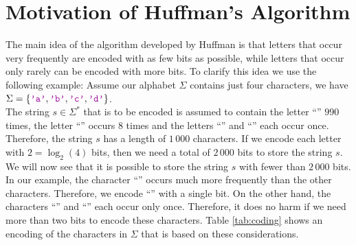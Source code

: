 \section[Motivation]{Motivation of  Huffman's Algorithm \label{sec:huffman}}
The main idea of the
algorithm developed by Huffman is that letters that occur very frequently are encoded with
as few bits as possible, while letters that occur only rarely can be encoded with more bits. 
To clarify this idea we use the following example:  Assume our alphabet $\Sigma$ contains just four characters, we have
\\[0.2cm]
\hspace*{1.3cm}
$\Sigma = \{ \mytt{'a'}, \mytt{'b'}, \mytt{'c'}, \mytt{'d'} \}$. 
\\[0.2cm]
The string $s \in \Sigma^*$ that is to be encoded is assumed to contain the letter
``'' $990$ times, the letter ``'' occurs $8$ times and the letters ``'' and
``'' each occur once.  Therefore, the string $s$ has a length of $1\,000$ characters.
If we encode each letter with $2 = \log_2(4)$ bits, then we need a total of $2\,000$ bits to store the string $s$.
We will now see that it is possible to store the string $s$ with fewer than $2\,000$ bits.
In our example, the character ``'' occurs much more frequently than the other characters.  Therefore, we
encode ``'' with a single bit.  On the other hand, the characters ``'' and ``''
each occur only once.  Therefore, it does no harm if we need more than two bits to encode these characters.
Table \ref{tab:coding} shows an encoding of the characters in $\Sigma$ that is based on these considerations.

